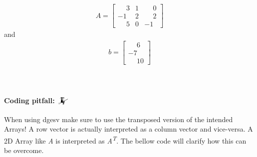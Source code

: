 \documentclass {article}
\begin{document}
\begin{align*}
A = 
\left[
\begin{matrix}
\phantom{-} 3 & 1 & \phantom{-}0 \\
-1 & 2 & \phantom{-}2 \\
\phantom{-} 5 & 0 & -1
\end{matrix}
\right]
\end{align*} 
and 
\begin{align*}
b=
\left[
\begin{matrix}
\phantom{-} 6\\
-7\\
\phantom{-}10
\end{matrix}
\right]
\end{align*}
\\
\\
\paragraph{Coding pitfall: $\mathwitch$} When using dgesv make sure to use the transposed version of the intended Arrays! A row vector is actually interpreted as a column vector and vice-versa. A 2D Array like \textit{A} is interpreted as \textit{A\textsuperscript{T}}. The bellow code will clarify how this can be overcome.     
\end{document}
